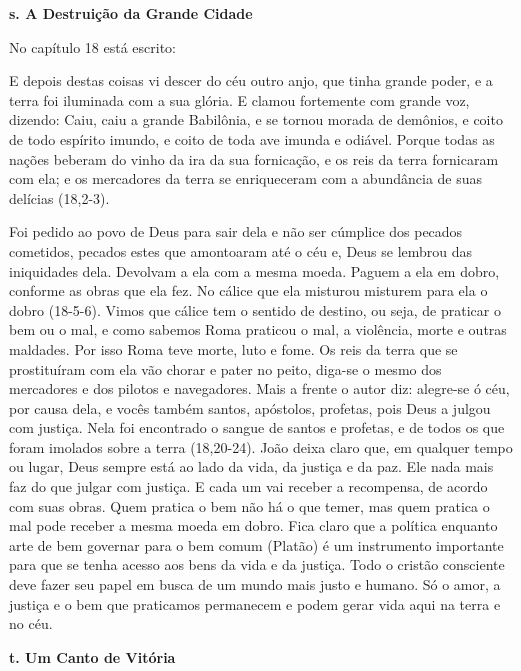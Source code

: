 \documentclass[
]{book}
\begin{document}
\textbf{s. A Destruição da Grande Cidade}

No capítulo 18 está escrito:

E depois destas coisas vi descer do céu outro anjo, que tinha grande poder, e a terra foi iluminada com a sua glória. E clamou fortemente com grande voz, dizendo: Caiu, caiu a grande Babilônia, e se tornou morada de demônios, e coito de todo espírito imundo, e coito de toda ave imunda e odiável. Porque todas as nações beberam do vinho da ira da sua fornicação, e os reis da terra fornicaram com ela; e os mercadores da terra se enriqueceram com a abundância de suas delícias (18,2-3).

Foi pedido ao povo de Deus para sair dela e não ser cúmplice dos pecados cometidos, pecados estes que amontoaram até o céu e, Deus se lembrou das iniquidades dela. Devolvam a ela com a mesma moeda. Paguem a ela em dobro, conforme as obras que ela fez. No cálice que ela misturou misturem para ela o dobro (18-5-6). Vimos que cálice tem o sentido de destino, ou seja, de praticar o bem ou o mal, e como sabemos Roma praticou o mal, a violência, morte e outras maldades. Por isso Roma teve morte, luto e fome. Os reis da terra que se prostituíram com ela vão chorar e pater no peito, diga-se o mesmo dos mercadores e dos pilotos e navegadores. Mais a frente o autor diz: alegre-se ó céu, por causa dela, e vocês também santos, apóstolos, profetas, pois Deus a julgou com justiça. Nela foi encontrado o sangue de santos e profetas, e de todos os que foram imolados sobre a terra (18,20-24). João deixa claro que, em qualquer tempo ou lugar, Deus sempre está ao lado da vida, da justiça e da paz. Ele nada mais faz do que julgar com justiça. E cada um vai receber a recompensa, de acordo com suas obras. Quem pratica o bem não há o que temer, mas quem pratica o mal pode receber a mesma moeda em dobro. Fica claro que a política enquanto arte de bem governar para o bem comum (Platão) é um instrumento importante para que se tenha acesso aos bens da vida e da justiça. Todo o cristão consciente deve fazer seu papel em busca de um mundo mais justo e humano. Só o amor, a justiça e o bem que praticamos permanecem e podem gerar vida aqui na terra e no céu.

\textbf{t. Um Canto de Vitória}
\end{document}
